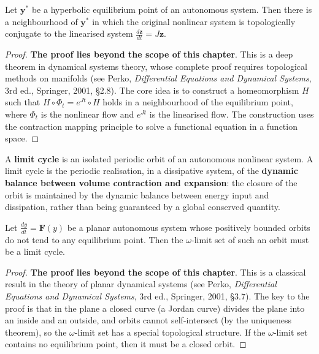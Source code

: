 \begin{theorem}\label{thm:hartman_grobman}
Let $\mathbf{y}^*$ be a hyperbolic equilibrium point of an autonomous system. Then there is a neighbourhood of $\mathbf{y}^*$ in which the original nonlinear system is topologically conjugate to the linearised system $\frac{d\mathbf{z}}{dt} = J\mathbf{z}$.
\end{theorem}

\begin{proof}
\textbf{The proof lies beyond the scope of this chapter}. This is a deep theorem in dynamical systems theory, whose complete proof requires topological methods on manifolds (see Perko, \textit{Differential Equations and Dynamical Systems}, 3rd ed., Springer, 2001, \S{}2.8). The core idea is to construct a homeomorphism $H$ such that $H \circ \Phi_t = e^{Jt} \circ H$ holds in a neighbourhood of the equilibrium point, where $\Phi_t$ is the nonlinear flow and $e^{Jt}$ is the linearised flow. The construction uses the contraction mapping principle to solve a functional equation in a function space.
\end{proof}

\begin{definition}\label{def:limit_cycle}
A \textbf{limit cycle} is an isolated periodic orbit of an autonomous nonlinear system. A limit cycle is the periodic realisation, in a dissipative system, of the \textbf{dynamic balance between volume contraction and expansion}: the closure of the orbit is maintained by the dynamic balance between energy input and dissipation, rather than being guaranteed by a global conserved quantity.
\end{definition}

\begin{theorem}\label{thm:poincare_bendixson}
Let $\frac{dy}{dt} = \mathbf{F}(y)$ be a planar autonomous system whose positively bounded orbits do not tend to any equilibrium point. Then the $\omega$-limit set of such an orbit must be a limit cycle.
\end{theorem}

\begin{proof}
\textbf{The proof lies beyond the scope of this chapter}. This is a classical result in the theory of planar dynamical systems (see Perko, \textit{Differential Equations and Dynamical Systems}, 3rd ed., Springer, 2001, \S{}3.7). The key to the proof is that in the plane a closed curve (a Jordan curve) divides the plane into an inside and an outside, and orbits cannot self-intersect (by the uniqueness theorem), so the $\omega$-limit set has a special topological structure. If the $\omega$-limit set contains no equilibrium point, then it must be a closed orbit.
\end{proof}

